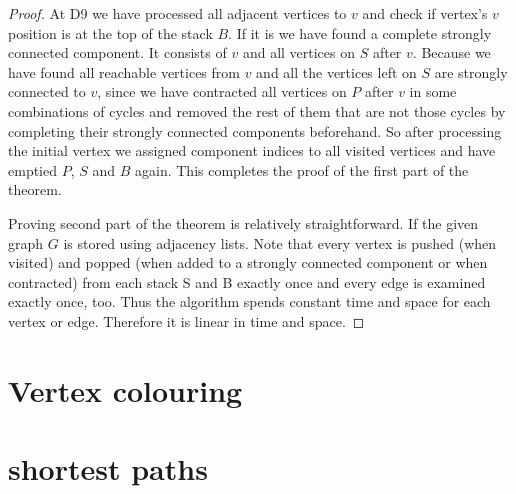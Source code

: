 \documentclass{report}
\theoremstyle{plain}
\theoremstyle{definition}
\theoremstyle{remark}
\numberwithin{definition}{chapter}
\numberwithin{example}{chapter}
\numberwithin{figure}{chapter}
\begin{document}
\begin{proof}
At D9 we have processed all adjacent vertices to $v$ and check if vertex's $v$ position is at the top of the stack $B$. If it is we have found a complete strongly connected component. It consists of $v$ and all vertices on $S$ after $v$. Because we have found all reachable vertices from $v$ and all the vertices left on $S$ are strongly connected to $v$, since we have contracted all vertices on $P$ after $v$ in some combinations of cycles and removed the rest of them that are not those cycles by completing their strongly connected components beforehand. So after processing the initial vertex we assigned component indices to all visited vertices and have emptied $P$, $S$ and $B$ again. This completes the proof  of the first part of the theorem.

Proving second part of the theorem is relatively straightforward. If the given graph $G$ is stored using adjacency lists. Note that every vertex is pushed (when visited) and popped (when added to a strongly connected component or when contracted) from each stack S and B exactly once and every edge is examined exactly once, too. Thus the algorithm spends constant time and space for each vertex or edge. Therefore it is linear in time and space.
\end{proof}

\chapter{Vertex colouring}

\chapter{shortest paths}



\end{document}
